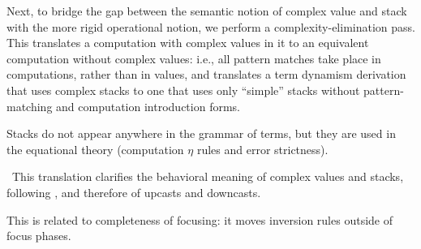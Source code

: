 \documentclass[acmsmall,nonacm]{acmart}
\begin{document}
Next, to bridge the gap between the semantic notion of complex value
and stack with the more rigid operational notion, we perform a
complexity-elimination pass.
%
This translates a computation with complex values in it to an equivalent
computation without complex values: i.e., all pattern matches take place
in computations, rather than in values, and translates a term dynamism
derivation that uses complex stacks to one that uses only ``simple''
stacks without pattern-matching and computation introduction forms.
%
\begin{longonly}
  Stacks do not appear anywhere in the grammar of terms, but they are
used in the equational theory (computation $\eta$ rules and error
strictness).
\end{longonly}
%
\ This translation clarifies the behavioral meaning of complex values and
stacks, following \citet{munchmaccagnoni14nonassociative,
  fuhrmann1999direct}, and therefore of upcasts and downcasts.
\begin{longonly}
This is related to completeness of focusing: it moves inversion rules
outside of focus phases.
\end{longonly}
\end{document}
